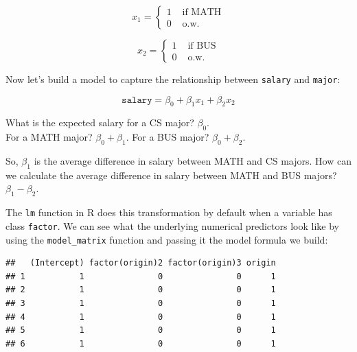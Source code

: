 \documentclass[]{article}
\newenvironment{Shaded}{\begin{snugshade}}{\end{snugshade}}
\newcommand{\KeywordTok}[1]{\textcolor[rgb]{0.13,0.29,0.53}{\textbf{{#1}}}}
\newcommand{\DataTypeTok}[1]{\textcolor[rgb]{0.13,0.29,0.53}{{#1}}}
\newcommand{\StringTok}[1]{\textcolor[rgb]{0.31,0.60,0.02}{{#1}}}
\newcommand{\NormalTok}[1]{{#1}}
\theoremstyle{definition}
\theoremstyle{definition}
\theoremstyle{remark}
\begin{document}
\[
x_1 = \left\{
\begin{align}
1 & \textrm{ if MATH} \\
0 & \textrm{ o.w.}
\end{align}
\right.
\]

\[
x_2 = \left\{
\begin{align}
1 & \textrm{ if BUS} \\
0 & \textrm{ o.w.}
\end{align}
\right.
\]

Now let's build a model to capture the relationship between
\texttt{salary} and \texttt{major}:

\[
\mathtt{salary} = \beta_0 + \beta_1 x_1 + \beta_2 x_2
\]

What is the expected salary for a CS major? \(\beta_0\).\\For a MATH
major? \(\beta_0 + \beta_1\). For a BUS major? \(\beta_0 + \beta_2\).

So, \(\beta_1\) is the average difference in salary between MATH and CS
majors. How can we calculate the average difference in salary between
MATH and BUS majors? \(\beta_1 - \beta_2\).

The \texttt{lm} function in R does this transformation by default when a
variable has class \texttt{factor}. We can see what the underlying
numerical predictors look like by using the \texttt{model\_matrix}
function and passing it the model formula we build:

\begin{Shaded}
\end{Shaded}

\begin{Shaded}
\end{Shaded}

\begin{verbatim}
##   (Intercept) factor(origin)2 factor(origin)3 origin
## 1           1               0               0      1
## 2           1               0               0      1
## 3           1               0               0      1
## 4           1               0               0      1
## 5           1               0               0      1
## 6           1               0               0      1
\end{verbatim}
\end{document}
